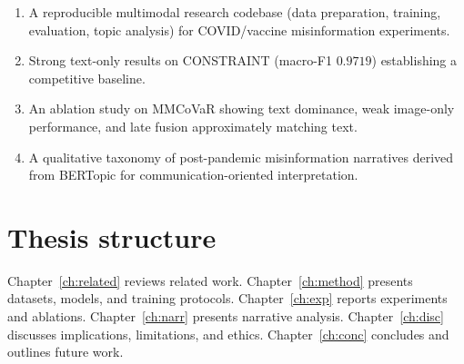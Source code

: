 \begin{enumerate}
  \item A reproducible multimodal research codebase (data preparation, training, evaluation, topic analysis) for COVID/vaccine misinformation experiments.
  \item Strong text-only results on CONSTRAINT (macro-F1 $0.9719$) establishing a competitive baseline.
  \item An ablation study on MMCoVaR showing text dominance, weak image-only performance, and late fusion approximately matching text.
  \item A qualitative taxonomy of post-pandemic misinformation narratives derived from BERTopic for communication-oriented interpretation.
\end{enumerate}

\section{Thesis structure}

Chapter~\ref{ch:related} reviews related work.
Chapter~\ref{ch:method} presents datasets, models, and training protocols.
Chapter~\ref{ch:exp} reports experiments and ablations.
Chapter~\ref{ch:narr} presents narrative analysis.
Chapter~\ref{ch:disc} discusses implications, limitations, and ethics.
Chapter~\ref{ch:conc} concludes and outlines future work.
